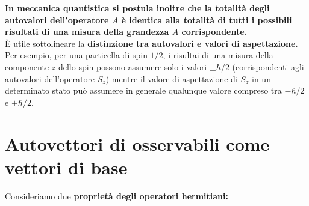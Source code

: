 \documentclass[a4paper,12pt,oneside]{book}
\begin{document}
\textbf{In meccanica quantistica si postula inoltre che la totalità degli autovalori dell'operatore $A$ è identica alla totalità di tutti i possibili risultati di una misura della grandezza $A$ corrispondente.}\\
È utile sottolineare la \textbf{distinzione tra autovalori e valori di aspettazione.} Per esempio, per una particella di spin $1/2$, i risultai di una misura della componente $z$ dello spin possono assumere solo i valori $\pm \hbar/2$ (corrispondenti agli autovalori dell'operatore $S_z$) mentre il valore di aspettazione di $S_z$ in un determinato stato può assumere in generale qualunque valore compreso tra $-\hbar /2$ e $+\hbar /2$.
\newpage
\section{Autovettori di osservabili come vettori di base}
Consideriamo due \textbf{proprietà degli operatori hermitiani:}
\end{document}
